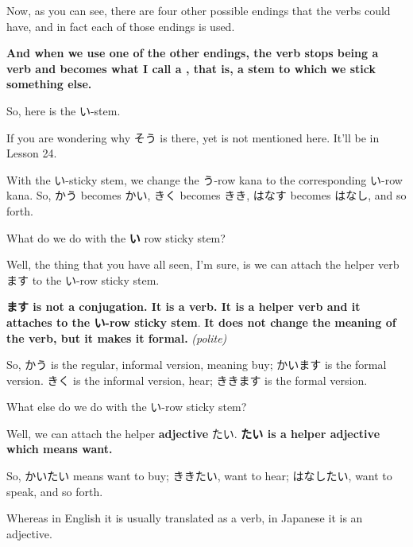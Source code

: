 Now, as you can see, there are four other possible endings that the verbs could have, and in fact each of those endings is used.

{}

{\bf And when we use one of the other endings, the verb stops being a verb and becomes what I call a , that is, a stem to which we stick something else.}

\stopsectionlevel

\startsectionlevel[title={The い-stem},reference={the-い-stem}]

So, here is the い-stem.

{}

If you are wondering why そう is there, yet is not mentioned here. It'll be in Lesson 24. {}

With the い-sticky stem, we change the う-row kana to the corresponding い-row kana. So, かう becomes かい, きく becomes きき, はなす becomes はなし, and so forth.

What do we do with the {\bf い} row sticky stem?

\startsectionlevel[title={Helper verb ます},reference={helper-verb-ます}]

Well, the thing that you have all seen, I'm sure, is we can attach the helper verb ます to the い-row sticky stem.

{}

{\bf ます is not a conjugation. It is a verb. It is a helper verb and it attaches to the い-row sticky stem}. {\bf It does not change the meaning of the verb, but it makes it formal.} {\em (polite)}

So, かう is the regular, informal version, meaning buy; かいます is the formal version. きく is the informal version, hear; ききます is the formal version.

\stopsectionlevel

\startsectionlevel[title={Helper adjective たい},reference={helper-adjective-たい}]

What else do we do with the い-row sticky stem?

Well, we can attach the helper {\bf adjective} たい. {\bf たい is a helper adjective which means want.}

So, かいたい means want to buy; ききたい, want to hear; はなしたい, want to speak, and so forth.

Whereas in English it is usually translated as a verb, in Japanese it is an adjective.

